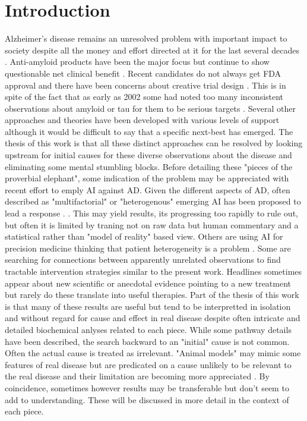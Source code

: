 \section{Introduction  }
Alzheimer's disease
\cite{PMC10015576}
 remains an unresolved problem 
with important impact to society 
\cite{Chandra_Coile_Mommaerts_What_Economics_2023}
despite
all the money and effort directed at it for the last
several decades
\cite{Cummings_Goldman_SimmonsStern_costs_developing_2022}
. 
Anti-amyloid products  have been the major focus
but continue
to show questionable net clinical benefit
\cite{Ross_Weinberg_Arnold_Cost_effectiveness_Aducanumab_2022}
\cite{Panza_Dibello_Sardone_Successes_failures_2025}.
Recent candidates do not always get FDA approval 
\cite{PMID41860361}
 and there have been concerns about creative trial design
\cite{Forlenza_AlencarPiresBarbosa_What_reasons_2025}
.
This is in spite of the fact that as early as 2002
some had noted too many inconsistent observations about  amyloid
or tau for them to  be serious targets
\cite{Mudher_Lovestone_Alzheimer_disease_2002}
.
Several other approaches and theories have been
developed with various levels of support although it
would be difficult to say that a specific next-best has emerged.
The thesis of this work is that all these distinct
approaches can be resolved by looking upstream for
initial causes for these diverse observations about the disease
and eliminating some mental stumbling blocks. 
Before detailing these "pieces of the proverbial elephant",
some indication of the problem may be appreciated
with recent effort to emply AI against AD.
Given the different aspects of AD, often described
as "multifactorial" or "heterogenous" 
emerging AI has been proposed  to lead a response 
\cite{Jasodanand_Bellitti_Kolachalama_AIfirst_framework_2025}.
\cite{FUNK2026100402}.
This  may yield results, its progressing too rapidly to rule out, 
but often it is limited by traning not on raw data but
human commentary and a statistical rather than "model
of reality" based view.
Others are using AI for precision medicine thinking that
patient heterogeneity is a problem  \cite{WELCHMAN2026100397}.  
Some are searching for connections between 
apparently unrelated observations \cite{Hein2025} to
find tractable intervention strategies similar to the present work. 
Headlines sometimes appear about new scientific or anecdotal
evidence pointing to a new treatment but rarely do these
translate into useful therapies. Part of the  thesis of this work
is that many of these results are useful but tend to be
interpretted in isolation and without regard for cause
and effect in real disease despite often intricate and detailed
biochemical anlyses related to each piece.
While some pathway details have been described, the
search backward to an "initial" cause is not common. 
Often the actual cause is treated as irrelevant. 
"Animal models" may mimic some features of real disease but
are predicated on a cause unlikely to be relevant to 
the real disease 
\cite{Polis_Samson_Addressing_Discrepancies_Between_2024}
and their limitation are becoming more appreciated
. By coincidence, sometimes however
results may be transferable but don't seem to add to understanding.
These will be discussed in more detail in the context of each piece. 

